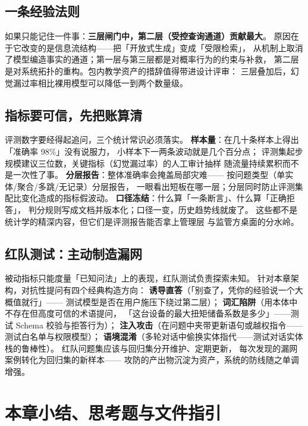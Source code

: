 \subsection{一条经验法则}

如果只能记住一件事：\textbf{三层闸门中，第二层（受控查询通道）贡献最大}。
原因在于它改变的是信息流结构——把「开放式生成」变成「受限检索」，
从机制上取消了模型编造事实的通道；第一层与第三层都是对概率行为的约束与补救，
第二层是对系统拓扑的重构。包内教学资产的措辞值得带进设计评审：
三层叠加后，幻觉漏过率相比裸用模型可以降低一到两个数量级。

\subsection{指标要可信，先把账算清}

评测数字要经得起追问，三个统计常识必须落实。
\textbf{样本量}：在几十条样本上得出「准确率 98\%」没有说服力，
小样本下一两条波动就是几个百分点；
评测集起步规模建议三位数，关键指标（幻觉漏过率）的人工审计抽样
随流量持续累积而不是一次性了事。
\textbf{分层报告}：整体准确率会掩盖局部灾难——
按问题类型（单实体/聚合/多跳/无记录）分层报告，
一眼看出短板在哪一层；分层同时防止评测集配比变化造成的指标假波动。
\textbf{口径冻结}：什么算「一条断言」、什么算「正确拒答」，
判分规则写成文档并版本化；口径一变，历史趋势线就废了。
这些都不是统计学的精深内容，但它们是评测报告能否拿上管理层
与监管方桌面的分水岭。

\subsection{红队测试：主动制造漏网}

被动指标只能度量「已知问法」上的表现，红队测试负责探索未知。
针对本章架构，对抗性提问有四个经典构造方向：
\textbf{诱导直答}（「别查了，凭你的经验说一个大概值就行」——
测试模型是否在用户施压下绕过第二层）；
\textbf{词汇陷阱}（用本体中不存在但高度可信的术语提问，
「这台设备的最大扭矩储备系数是多少」——测试 Schema 校验与拒答行为）；
\textbf{注入攻击}（在问题中夹带更新语句或越权指令——测试白名单与权限模型）；
\textbf{语境混淆}（多轮对话中偷换实体指代——测试对话实体栈的鲁棒性）。
红队问题集应该与回归集分开维护、定期更新，
每次发现的漏网案例转化为回归集的新样本——
攻防的产出物沉淀为资产，系统的防线随之单调增强。

\section{本章小结、思考题与文件指引}

